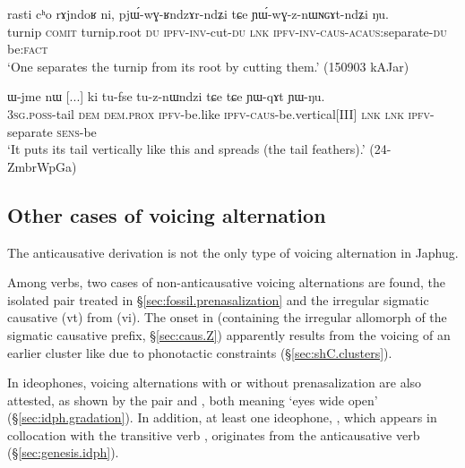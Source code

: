\begin{exe}
\ex \label{ex:YWwGznWNGAtndZi2}
\gll rasti cʰo rɤjndoʁ ni, pjɯ́-wɣ-ʁndzɤr-ndʑi tɕe ɲɯ́-wɣ-z-nɯɴɢɤt-ndʑi ŋu.\\
turnip \textsc{comit} turnip.root \textsc{du} \textsc{ipfv}-\textsc{inv}-cut-\textsc{du} \textsc{lnk} \textsc{ipfv}-\textsc{inv}-\textsc{caus}-\textsc{acaus}:separate-\textsc{du} be:\textsc{fact}\\
\glt `One separates the turnip from its root by cutting them.' (150903 kAJar)
\end{exe}

\begin{exe}
\ex \label{ex:Wjme.YWqAt}
\gll ɯ-jme nɯ [...] ki tu-fse tu-z-nɯndzi tɕe tɕe ɲɯ-qɤt ɲɯ-ŋu. \\
\textsc{3sg}.\textsc{poss}-tail \textsc{dem}  {  }  \textsc{dem}.\textsc{prox} \textsc{ipfv}-be.like \textsc{ipfv}-\textsc{caus}-be.vertical[III] \textsc{lnk} \textsc{lnk} \textsc{ipfv}-separate \textsc{sens}-be \\
\glt `It puts its tail vertically like this and spreads (the tail feathers).' (24-ZmbrWpGa) 	
\end{exe}

\subsection{Other cases of voicing alternation} \label{sec:voicing.alternation.non.anticausative}
  
The anticausative derivation is not the only type of voicing alternation in Japhug. 

Among verbs, two cases of non-anticausative voicing alternations are found, the isolated pair treated in §\ref{sec:fossil.prenasalization} and the irregular sigmatic causative  (vt) from  (vi). The onset  in  (containing the irregular  allomorph of the sigmatic causative prefix, §\ref{sec:caus.Z}) apparently results from the voicing of an earlier cluster like   due to phonotactic constraints (§\ref{sec:shC.clusters}). 

In ideophones, voicing alternations with or without prenasalization are also attested, as shown by the pair  and , both meaning `eyes wide open' (§\ref{sec:idph.gradation}). In addition, at least one ideophone, , which appears in collocation with the transitive verb , originates from the anticausative verb  (§\ref{sec:genesis.idph}).


